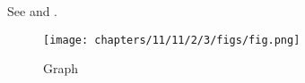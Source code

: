 See  and 
.
\begin{figure}[H]
\centering
\texttt{[image: chapters/11/11/2/3/figs/fig.png]}
\caption{Graph}
\label{fig:chapters/11/11/2/3/1}
\end{figure}
